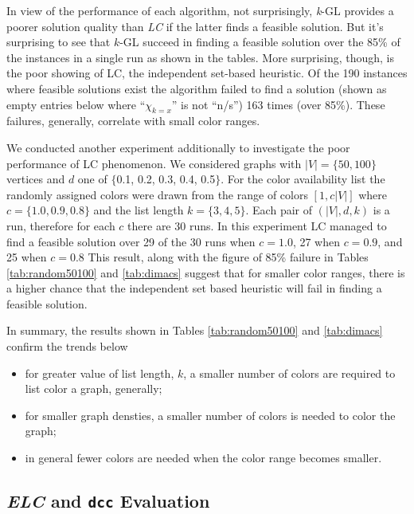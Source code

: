 \documentclass[10pt]{article}
\begin{document}
In view of the performance of each
algorithm, not surprisingly, \textit{k}-GL provides a poorer solution
quality than \textit{LC} if the latter finds a feasible solution.  But  it's surprising 
to see that $k$-GL succeed in finding a feasible
solution over the 85\% of the instances in a single run as shown in the tables. 
  More surprising, though, is the poor showing
 of LC, the independent set-based heuristic.  Of the 190 instances where feasible solutions
 exist the algorithm failed to find a solution (shown as empty entries
 below where ``$\chi_{k=x}$'' is not ``n/s'') 163 times (over 85\%). These failures, generally, correlate with small
 color ranges. 
 
We conducted another experiment additionally to investigate the poor performance of LC phenomenon.  
We considered graphs with
$|V|=\{50,100\}$ vertices and $d$ one
of $\{$0.1, 0.2, 0.3, 0.4, 0.5$\}$.  For the color availability list the randomly 
assigned colors were drawn from the range of colors $[1,c|V|]$ where $c=\{1.0, 0.9, 0.8\}$
and the list length $k = \{3, 4, 5\}$. Each pair of $(|V|, d, k)$ is a run, therefore for each $c$ 
there are 30 runs. 
In this experiment LC managed to find a feasible 
solution over 29 of the 30 runs when $c = 1.0$, 27 when $c=0.9$, and 25 when $c=0.8$
This result, along with the figure of 85\% failure in Tables \ref{tab:random50100} and \ref{tab:dimacs} 
 suggest that for smaller color ranges, there is a higher chance that the independent set based heuristic will
fail in finding a feasible solution. 

In summary, the results shown in Tables \ref{tab:random50100} and \ref{tab:dimacs} confirm the trends below
\begin{itemize}
\item for greater value of list length, $k$, a smaller number of
  colors are required to list color a graph, generally;
\item for smaller graph densties, a smaller number of colors is needed
  to color the graph;
\item in general fewer colors are needed when the color range becomes
  smaller.
\end{itemize}





\subsection{\textit{ELC} and \texttt{dcc} Evaluation} \label{sec:elc}
\end{document}

